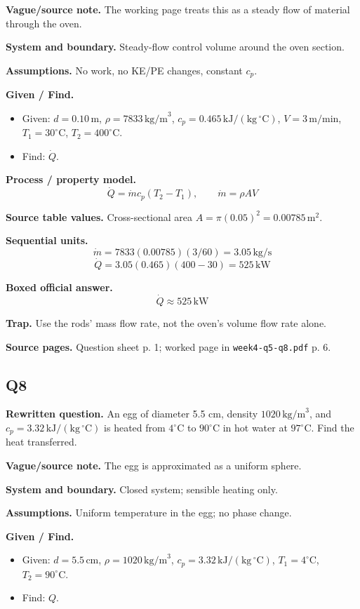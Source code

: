\textbf{Vague/source note.} The working page treats this as a steady flow of material through the oven.

\textbf{System and boundary.} Steady-flow control volume around the oven section.

\textbf{Assumptions.} No work, no KE/PE changes, constant $c_p$.

\textbf{Given / Find.}
\begin{itemize}
  \item Given: $d=0.10\,\text{m}$, $\rho=7833\,\text{kg/m}^3$, $c_p=0.465\,\mathrm{kJ/(kg\,^{\circ}C)}$, $V=3\,\text{m/min}$, $T_1=30^\circ\text{C}$, $T_2=400^\circ\text{C}$.
  \item Find: $\dot Q$.
\end{itemize}

\textbf{Process / property model.}
\[
\dot Q=\dot m c_p(T_2-T_1),\qquad \dot m=\rho A V
\]

\textbf{Source table values.} Cross-sectional area $A=\pi(0.05)^2=0.00785\,\text{m}^2$.

\textbf{Sequential units.}
\[
\dot m=7833(0.00785)(3/60)=3.05\,\text{kg/s}
\]
\[
\dot Q=3.05(0.465)(400-30)=525\,\text{kW}
\]

\textbf{Boxed official answer.}
\[
\boxed{\dot Q\approx 525\,\text{kW}}
\]

\textbf{Trap.} Use the rods' mass flow rate, not the oven's volume flow rate alone.

\textbf{Source pages.} Question sheet p. 1; worked page in \texttt{week4-q5-q8.pdf} p. 6.

\subsection*{Q8}
\textbf{Rewritten question.} An egg of diameter 5.5 cm, density $1020\,\text{kg/m}^3$, and $c_p=3.32\,\mathrm{kJ/(kg\,^{\circ}C)}$ is heated from $4^\circ\text{C}$ to $90^\circ\text{C}$ in hot water at $97^\circ\text{C}$. Find the heat transferred.

\textbf{Vague/source note.} The egg is approximated as a uniform sphere.

\textbf{System and boundary.} Closed system; sensible heating only.

\textbf{Assumptions.} Uniform temperature in the egg; no phase change.

\textbf{Given / Find.}
\begin{itemize}
  \item Given: $d=5.5\,\text{cm}$, $\rho=1020\,\text{kg/m}^3$, $c_p=3.32\,\mathrm{kJ/(kg\,^{\circ}C)}$, $T_1=4^\circ\text{C}$, $T_2=90^\circ\text{C}$.
  \item Find: $Q$.
\end{itemize}

